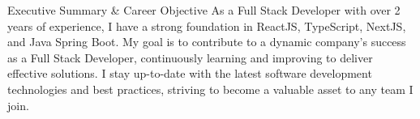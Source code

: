 \documentclass{resume} %
\begin{document}

\begin{rSection}{Executive Summary \& Career Objective}
As a Full Stack Developer with over 2 years of experience, I have a strong foundation in ReactJS, TypeScript, NextJS, and Java Spring Boot. My goal is to contribute to a dynamic company's success as a Full Stack Developer, continuously learning and improving to deliver effective solutions. I stay up-to-date with the latest software development technologies and best practices, striving to become a valuable asset to any team I join.
\end{rSection}

\end{document}
